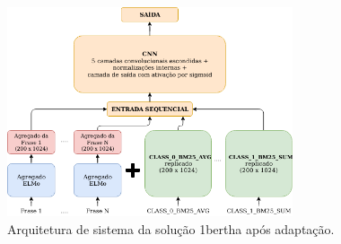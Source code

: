 \begin{figure}[ht]
    \centering
    \caption{Arquitetura de sistema da solução 1\underscore{}bertha após adaptação.}
    \begin{center}
        \includegraphics[width=0.75\textwidth]{img/1-bertha-arquitetura-com-ri.png}
    \end{center}
    \vspace{-0.5cm}
    \label{fig:1-bertha-arquitetura-com-ri}
\end{figure}